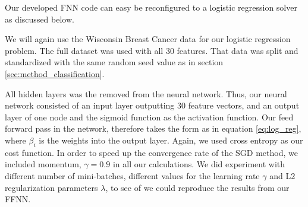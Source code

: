 Our developed FNN code can easy be reconfigured to a logistic regression
solver as discussed below.

We will again use the Wisconsin Breast Cancer data for our logistic regression
problem. The full dataset was used with all 30 features. That data was split
and standardized with the same random seed value as in section
\ref{sec:method_classification}. 

All hidden layers was the removed from the neural network. Thus, our neural
network consisted of an input layer outputting 30 feature vectors, and an
output layer of one node and the sigmoid function as the activation function.
Our feed forward pass in the network, therefore takes the form as in equation
\ref{eq:log_reg}, where $\beta _i$ is the weights into the output layer. 
Again, we used cross entropy as our cost function. In order to speed up the
convergence rate of the SGD method, we included momentum, $\gamma = 0.9$ in all our
calculations. We did experiment with different number of mini-batches,
different values for the learning rate $\gamma$ and L2 regularization parameters
$\lambda $, to see of we could reproduce the results from our FFNN.   









